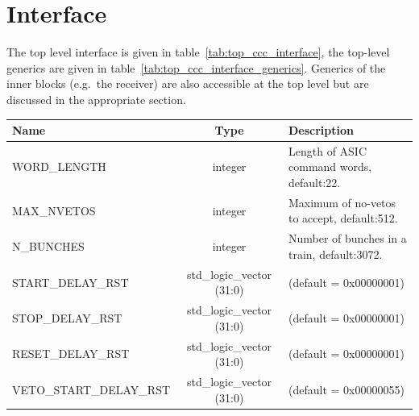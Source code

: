 \section{Interface} %
\label{sub:top_interface}
The top level interface is given in table~\ref{tab:top_ccc_interface}, the top-level generics are given in table~\ref{tab:top_ccc_interface_generics}. Generics of the inner blocks (e.g.\ the receiver) are also accessible at the top level but are discussed in the appropriate section. 
\begin{table}
    \begin{center}
        \begin{tabulary}{\textwidth}{l | c | L}
            Name & Type & Description \\
            \hline
            WORD\_LENGTH               & integer                   & Length of ASIC command words, default:22.    \\
            MAX\_NVETOS                & integer                   & Maximum of no-vetos to accept, default:512.  \\
            N\_BUNCHES                 & integer                   & Number of bunches in a train, default:3072.  \\ 
            START\_DELAY\_RST          & std\_logic\_vector (31:0) & (default = 0x00000001)                \\
            STOP\_DELAY\_RST           & std\_logic\_vector (31:0) & (default = 0x00000001)                \\
            RESET\_DELAY\_RST          & std\_logic\_vector (31:0) & (default = 0x00000001)                \\
            VETO\_START\_DELAY\_RST    & std\_logic\_vector (31:0) & (default = 0x00000055)                \\

\end{tabulary}
\end{center}
\end{table}
